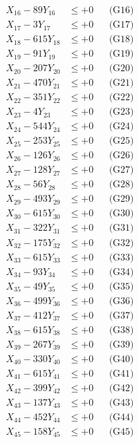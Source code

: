 \documentclass[a4paper,10pt]{article}
\begin{document}
{\begin{align}
X_{16} - 89Y_{16} &\leq +0 && \text{(G16)} \\
X_{17} - 3Y_{17} &\leq +0 && \text{(G17)} \\
X_{18} - 615Y_{18} &\leq +0 && \text{(G18)} \\
X_{19} - 91Y_{19} &\leq +0 && \text{(G19)} \\
X_{20} - 207Y_{20} &\leq +0 && \text{(G20)} \\
\allowbreak
X_{21} - 470Y_{21} &\leq +0 && \text{(G21)} \\
X_{22} - 351Y_{22} &\leq +0 && \text{(G22)} \\
X_{23} - 4Y_{23} &\leq +0 && \text{(G23)} \\
X_{24} - 544Y_{24} &\leq +0 && \text{(G24)} \\
X_{25} - 253Y_{25} &\leq +0 && \text{(G25)} \\
X_{26} - 126Y_{26} &\leq +0 && \text{(G26)} \\
X_{27} - 128Y_{27} &\leq +0 && \text{(G27)} \\
X_{28} - 56Y_{28} &\leq +0 && \text{(G28)} \\
X_{29} - 493Y_{29} &\leq +0 && \text{(G29)} \\
X_{30} - 615Y_{30} &\leq +0 && \text{(G30)} \\
\allowbreak
X_{31} - 322Y_{31} &\leq +0 && \text{(G31)} \\
X_{32} - 175Y_{32} &\leq +0 && \text{(G32)} \\
X_{33} - 615Y_{33} &\leq +0 && \text{(G33)} \\
X_{34} - 93Y_{34} &\leq +0 && \text{(G34)} \\
X_{35} - 49Y_{35} &\leq +0 && \text{(G35)} \\
X_{36} - 499Y_{36} &\leq +0 && \text{(G36)} \\
X_{37} - 412Y_{37} &\leq +0 && \text{(G37)} \\
X_{38} - 615Y_{38} &\leq +0 && \text{(G38)} \\
X_{39} - 267Y_{39} &\leq +0 && \text{(G39)} \\
X_{40} - 330Y_{40} &\leq +0 && \text{(G40)} \\
\allowbreak
X_{41} - 615Y_{41} &\leq +0 && \text{(G41)} \\
X_{42} - 399Y_{42} &\leq +0 && \text{(G42)} \\
X_{43} - 137Y_{43} &\leq +0 && \text{(G43)} \\
X_{44} - 452Y_{44} &\leq +0 && \text{(G44)} \\
X_{45} - 158Y_{45} &\leq +0 && \text{(G45)} \\

\end{align}}
\end{document}
